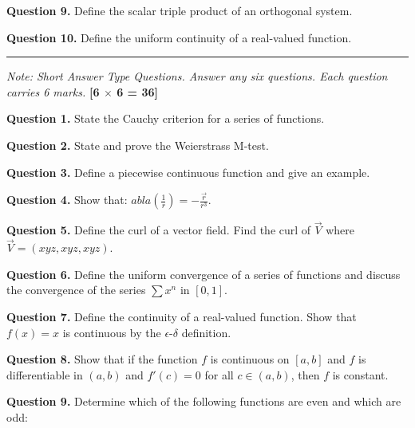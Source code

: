 \documentclass[11pt,a4paper]{article}
\begin{document}
\medskip


\noindent   \textbf{Question 9.} Define the scalar triple product of an orthogonal system.

\medskip


\noindent   \textbf{Question 10.} Define the uniform continuity of a real-valued function.

\bigskip


\rule{\linewidth}{0.4pt}\smallskip




\noindent   \textit{Note: Short Answer Type Questions. Answer any six questions. Each question carries 6 marks.} \hfill   \textbf{[6 $ \times$ 6 = 36]}

\medskip


\noindent   \textbf{Question 1.} State the Cauchy criterion for a series of functions.

\medskip


\noindent   \textbf{Question 2.} State and prove the Weierstrass M-test.

\medskip


\noindent   \textbf{Question 3.} Define a piecewise continuous function and give an example.

\medskip


\noindent   \textbf{Question 4.} Show that: $
abla\left(\frac{1}{r}\right) = -\frac{\vec{r}}{r^3}$.

\medskip


\noindent   \textbf{Question 5.} Define the curl of a vector field. Find the curl of $\vec{V}$ where $\vec{V} = (xyz, xyz, xyz)$.

\medskip


\noindent   \textbf{Question 6.} Define the uniform convergence of a series of functions and discuss the convergence of the series $\sum x^n$ in $[0, 1]$.

\medskip


\noindent   \textbf{Question 7.} Define the continuity of a real-valued function. Show that $f(x) = x$ is continuous by the $\epsilon$-$\delta$ definition.

\medskip


\noindent   \textbf{Question 8.} Show that if the function $f$ is continuous on $[a, b]$ and $f$ is differentiable in $(a, b)$ and $f'(c) = 0$ for all $c \in (a, b)$, then $f$ is constant.

\medskip


\noindent   \textbf{Question 9.} Determine which of the following functions are even and which are odd:
\end{document}
